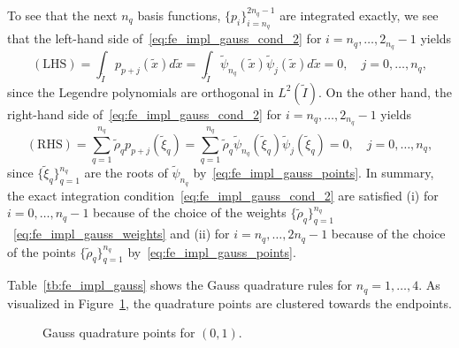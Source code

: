 To see that the next $n_q$ basis functions, $\{ p_i \}_{i=n_q}^{2n_q-1}$ are integrated exactly, we see that the left-hand side of~\ref{eq:fe_impl_gauss_cond_2} for $i = n_q,\dots,2_{n_q}-1$ yields 
\begin{equation*}
  (\text{LHS})
  = \int_{\tilde I} p_{p+j}(\tilde x) d \tilde x
  = \int_{\tilde I} \tilde \psi_{n_q}(\tilde x) \tilde \psi_{j}(\tilde x) d \tilde x
  = 0, \quad j = 0,\dots,n_q,
\end{equation*}
since the Legendre polynomials are orthogonal in $L^2(\tilde I)$. On the other hand, the right-hand side of~\ref{eq:fe_impl_gauss_cond_2} for $i = n_q,\dots,2_{n_q}-1$ yields
\begin{equation*}
  (\text{RHS})
  = \sum_{q=1}^{n_q} \tilde \rho_q p_{p+j}(\tilde \xi_q)
  = \sum_{q=1}^{n_q} \tilde \rho_q \tilde \psi_{n_q}(\tilde \xi_q) \tilde \psi_{j}(\tilde \xi_q)
  = 0, \quad j = 0,\dots,n_q,
\end{equation*}
since $\{\tilde \xi_q\}_{q=1}^{n_q}$ are the roots of $\tilde \psi_{n_q}$ by~\eqref{eq:fe_impl_gauss_points}. In summary, the exact integration condition~\ref{eq:fe_impl_gauss_cond_2} are satisfied (i) for $i = 0,\dots,n_q-1$ because of the choice of the weights $\{\tilde \rho_q\}_{q=1}^{n_q}$ ~\eqref{eq:fe_impl_gauss_weights} and (ii) for $i = n_q, \dots, 2 n_q-1$ because of the choice of the points $\{\tilde \rho_q\}_{q=1}^{n_q}$ by~\eqref{eq:fe_impl_gauss_points}.

Table~\ref{tb:fe_impl_gauss} shows the Gauss quadrature rules for $n_q = 1,\dots,4$.  As visualized in Figure~\ref{fig:fe_impl_gauss_points}, the quadrature points are clustered towards the endpoints.
\begin{figure}
  \centering
  \caption{Gauss quadrature points for $(0,1)$. \label{fig:fe_impl_gauss_points}}
\end{figure}

